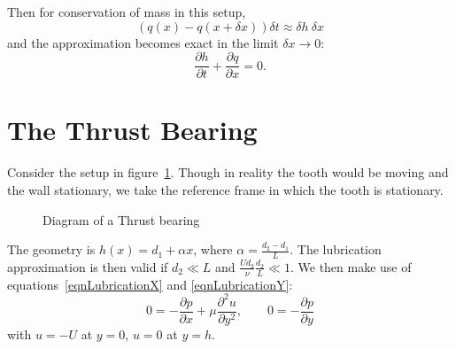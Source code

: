 \documentclass[../Main.tex]{subfiles}
\begin{document}
Then for conservation of mass in this setup,
\begin{equation*}
    (q(x) - q(x + \delta x)) \delta t \approx \delta h~\delta x
\end{equation*}
and the approximation becomes exact in the limit $\delta x \to 0$:
\begin{equation}
    \frac{\partial h}{\partial t} + \frac{\partial q}{\partial x} = 0.
    \label{eqnConserveMass}
\end{equation}
\section{The Thrust Bearing}
Consider the setup in figure~\ref{figThrustBearing}. Though in reality the tooth would be moving and the wall stationary, we take the reference frame in which the tooth is stationary.
\begin{figure}
    \centering
    \caption{Diagram of a Thrust bearing}
    \label{figThrustBearing}
\end{figure}

The geometry is $h(x) = d_1 + \alpha x$, where $\alpha = \frac{d_2 - d_1}{L}$. The lubrication approximation is then valid if $d_2 \ll L$ and $\frac{Ud_2}{\nu} \frac{d_2}{L} \ll 1$. We then make use of equations~\ref{eqnLubricationX} and \ref{eqnLubricationY}:
\begin{equation*}
    0 = -\frac{\partial p}{\partial x} + \mu \frac{\partial^{2}u}{\partial y^{2}},\qquad 0 = -\frac{\partial p}{\partial y}
\end{equation*}
with $u = -U$ at $y = 0$, $u = 0$ at $y = h$.
\end{document}
